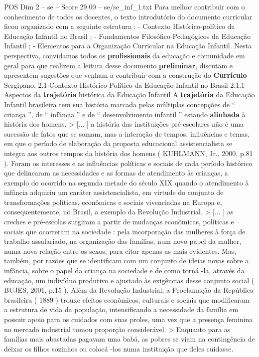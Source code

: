 \begin{textsample}{POS Dim 2 – se – Score 29.00 – se/se\_inf\_1.txt}
Para melhor contribuir com o conhecimento de todos os docentes, o texto introdutório do documento curricular ficou organizado com a seguinte estrutura : - Contexto Histórico-político da Educação Infantil no Brasil ; - Fundamentos Filosófico-Pedagógicos da Educação Infantil ; - Elementos para a Organização Curricular na Educação Infantil.
Nesta perspectiva, convidamos todos os \textbf{profissionais} da educação e comunidade em geral para que realizem a leitura desse documento \textbf{preliminar}, discutam e apresentem sugestões que venham a contribuir com a construção do \textbf{Currículo} Sergipano. 2.1 Contexto Histórico-Político da Educação Infantil no Brasil 2.1.1 Aspectos da \textbf{trajetória} histórica da Educação Infantil A \textbf{trajetória} da Educação Infantil brasileira tem sua história marcada pelas múltiplas concepções de “ criança ”, de “ infância ” e de “ desenvolvimento infantil ” estando \textbf{alinhada} à história dos homens. > [... ] a história das instituições pré-escolares não é uma sucessão de fatos que se somam, mas a interação de tempos, influências e temas, em que o período de elaboração da proposta educacional assistencialista se integra aos outros tempos da história dos homens ( KUHLMANN, Jr., 2000, p.81 ).
Foram os interesses e as influências políticas e sociais de cada período histórico que delinearam as necessidades e as formas de atendimento às crianças, a exemplo do ocorrido na segunda metade do século XIX quando o atendimento à infância adquiriu um caráter assistencialista, em virtude do conjunto de transformações políticas, econômicas e sociais vivenciadas na Europa e, consequentemente, no Brasil, a exemplo da Revolução Industrial. > [... ] as creches e pré-escolas surgiram a partir de mudanças econômicas, políticas e sociais que ocorreram na sociedade : pela incorporação das mulheres à força de trabalho assalariado, na organização das famílias, num novo papel da mulher, numa nova relação entre os sexos, para citar apenas as mais evidentes.
Mas, também, por razões que se identificam com um conjunto de ideias novas sobre a infância, sobre o papel da criança na sociedade e de como torná -la, através da educação, um indivíduo produtivo e ajustado às exigências desse conjunto social ( BUJES, 2001, p.15 ).
Além da Revolução Industrial, a Proclamação da República brasileira ( 1889 ) trouxe efeitos econômicos, culturais e sociais que modificaram a estrutura de vida da população, intensificando a necessidade da família em possuir apoio para os cuidados com suas proles, uma vez que a presença feminina no mercado industrial tomou proporção considerável. > Enquanto para as famílias mais abastadas pagavam uma babá, as pobres se viam na contingência de deixar os filhos sozinhos ou colocá -los numa instituição que deles cuidasse.

\end{textsample}
